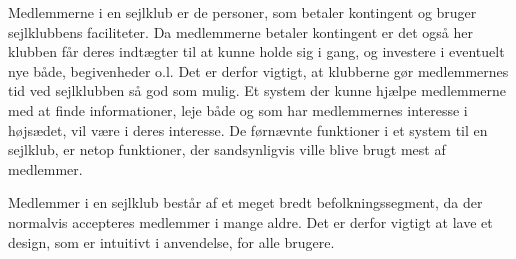 Medlemmerne i en sejlklub er de personer, som betaler kontingent og bruger sejlklubbens faciliteter.  
Da medlemmerne betaler kontingent er det også her klubben får deres indtægter til at kunne holde sig i gang, og investere i eventuelt nye både, begivenheder o.l. 
Det er derfor vigtigt, at klubberne gør medlemmernes tid ved sejlklubben så god som mulig. 
Et system der kunne hjælpe medlemmerne med at finde informationer, leje både og som har medlemmernes interesse i højsædet, vil være i deres interesse. 
De førnævnte funktioner i et system til en sejlklub, er netop funktioner, der sandsynligvis ville blive brugt mest af medlemmer.

Medlemmer i en sejlklub består af et meget bredt befolkningssegment, da der normalvis accepteres medlemmer i mange aldre.
Det er derfor vigtigt at lave et design, som er intuitivt i anvendelse, for alle brugere.





